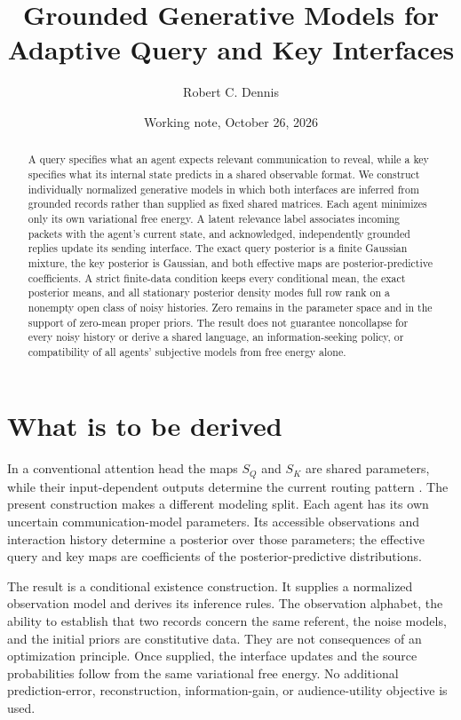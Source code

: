 \documentclass[11pt]{article}
\title{Grounded Generative Models for Adaptive Query and Key Interfaces}
\author{Robert C. Dennis}
\date{Working note, October 26, 2026}
\theoremstyle{definition}
\theoremstyle{remark}
\newcommand{\SQ}{S_{Q}}
\newcommand{\SK}{S_{K}}
\begin{document}
\maketitle
\begin{abstract}
A query specifies what an agent expects relevant communication to reveal, while a key specifies what its internal state predicts in a shared observable format. We construct individually normalized generative models in which both interfaces are inferred from grounded records rather than supplied as fixed shared matrices. Each agent minimizes only its own variational free energy. A latent relevance label associates incoming packets with the agent's current state, and acknowledged, independently grounded replies update its sending interface. The exact query posterior is a finite Gaussian mixture, the key posterior is Gaussian, and both effective maps are posterior-predictive coefficients. A strict finite-data condition keeps every conditional mean, the exact posterior means, and all stationary posterior density modes full row rank on a nonempty open class of noisy histories. Zero remains in the parameter space and in the support of zero-mean proper priors. The result does not guarantee noncollapse for every noisy history or derive a shared language, an information-seeking policy, or compatibility of all agents' subjective models from free energy alone.
\end{abstract}

\section{What is to be derived}

In a conventional attention head the maps \(\SQ\) and \(\SK\) are shared parameters, while their input-dependent outputs determine the current routing pattern \citep{Vaswani2017}. The present construction makes a different modeling split. Each agent has its own uncertain communication-model parameters. Its accessible observations and interaction history determine a posterior over those parameters; the effective query and key maps are coefficients of the posterior-predictive distributions.

The result is a conditional existence construction. It supplies a normalized observation model and derives its inference rules. The observation alphabet, the ability to establish that two records concern the same referent, the noise models, and the initial priors are constitutive data. They are not consequences of an optimization principle. Once supplied, the interface updates and the source probabilities follow from the same variational free energy. No additional prediction-error, reconstruction, information-gain, or audience-utility objective is used.
\end{document}
